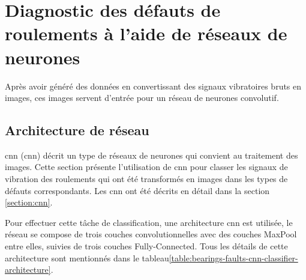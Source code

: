 \section{Diagnostic des défauts de roulements à l'aide de réseaux de neurones}
Après avoir généré des données en convertissant des signaux vibratoires bruts en images, ces images servent d'entrée pour un réseau de neurones convolutif.

\subsection{Architecture de réseau}
\acrlong{cnn} (\acrshort{cnn}) décrit un type de réseaux de neurones qui convient au traitement des images. Cette section présente l'utilisation de \acrshort{cnn} pour classer les signaux de vibration des roulements qui ont été transformés en images dans les types de défauts correspondants. Les \acrshort{cnn} ont été décrits en détail dans la section \ref{section:cnn}.

Pour effectuer cette tâche de classification, une architecture \acrshort{cnn} est utilisée, le réseau se compose de trois couches convolutionnelles avec des couches MaxPool entre elles, suivies de trois couches Fully-Connected. Tous les détails de cette architecture sont mentionnés dans le tableau\ref{table:bearings-faults-cnn-classifier-architecture}.

